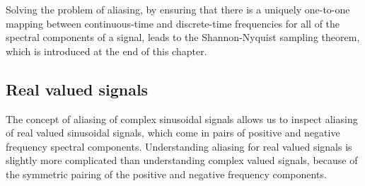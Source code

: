 Solving the problem of aliasing, by ensuring that there is a uniquely one-to-one mapping between continuous-time and discrete-time frequencies for all of the spectral components of a signal, leads to the Shannon-Nyquist sampling theorem, which is introduced at the end of this chapter.

\subsection{Real valued signals}
The concept of aliasing of complex sinusoidal signals allows us to inspect aliasing of real valued sinusoidal signals, which come in pairs of positive and negative frequency spectral components. Understanding aliasing for real valued signals is slightly more complicated than understanding complex valued signals, because of the symmetric pairing of the positive and negative frequency components.


